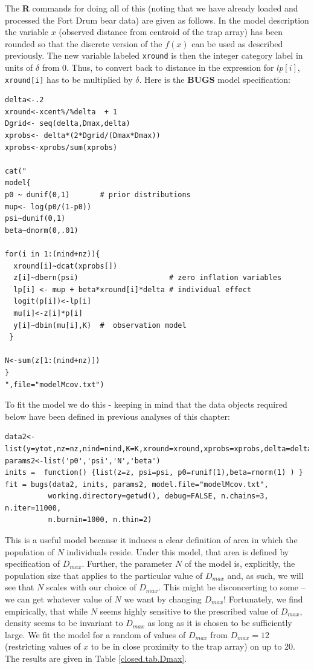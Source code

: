 The {\bf R} commands for doing all of this (noting that we have
already loaded and processed the Fort Drum bear data) are given as
follows. In the model description the variable $x$ (observed distance
from centroid of the trap array) has been rounded so that the discrete
version of the $f(x)$ can be used as described previously. The new
variable labeled \mbox{\tt xround} is then the integer category label
in units of $\delta$ from 0. Thus, to convert back to distance in the
expression for $lp[i]$, \mbox{\tt xround[i]} has to be multiplied by
$\delta$. Here is the {\bf BUGS} model specification: 
{\small
\begin{verbatim}
delta<-.2
xround<-xcent%/%delta  + 1
Dgrid<- seq(delta,Dmax,delta)
xprobs<- delta*(2*Dgrid/(Dmax*Dmax))
xprobs<-xprobs/sum(xprobs)

cat("
model{
p0 ~ dunif(0,1)       # prior distributions
mup<- log(p0/(1-p0))
psi~dunif(0,1)
beta~dnorm(0,.01)

for(i in 1:(nind+nz)){
  xround[i]~dcat(xprobs[])
  z[i]~dbern(psi)                     # zero inflation variables
  lp[i] <- mup + beta*xround[i]*delta # individual effect
  logit(p[i])<-lp[i]
  mu[i]<-z[i]*p[i]
  y[i]~dbin(mu[i],K)  #  observation model
 }

N<-sum(z[1:(nind+nz)])
}
",file="modelMcov.txt")
\end{verbatim}
}
To fit the model we do this - keeping in mind that the data objects
required below have been defined in previous analyses of this chapter:
{\small
\begin{verbatim}
data2<-list(y=ytot,nz=nz,nind=nind,K=K,xround=xround,xprobs=xprobs,delta=delta)
params2<-list('p0','psi','N','beta')
inits =  function() {list(z=z, psi=psi, p0=runif(1),beta=rnorm(1) ) }
fit = bugs(data2, inits, params2, model.file="modelMcov.txt",
          working.directory=getwd(), debug=FALSE, n.chains=3, n.iter=11000, 
          n.burnin=1000, n.thin=2)
\end{verbatim}
}

This is a useful model because it induces a clear definition of area
in which the population of $N$ individuals reside. Under this model,
that area is defined by specification of $D_{max}$. 
Further, the parameter $N$ of the model is, explicitly, the
population size that applies to the particular value of $D_{max}$ and,
as such, we will see that $N$ scales with our choice of $D_{max}$.
This might be disconcerting to some -- we can get whatever value of
$N$ we want by changing $D_{max}$!
Fortunately, we find empirically, that while $N$ seems
highly sensitive to the prescribed value of $D_{max}$, density seems to
be invariant to $D_{max}$ as long as it is chosen to be sufficiently
large. We fit the model for a random of values of $D_{max}$ from $D_{max}=12$ (restricting
values of $x$ to be in close proximity to
the trap array) on up to 20. The results are given in Table
\ref{closed.tab.Dmax}.

